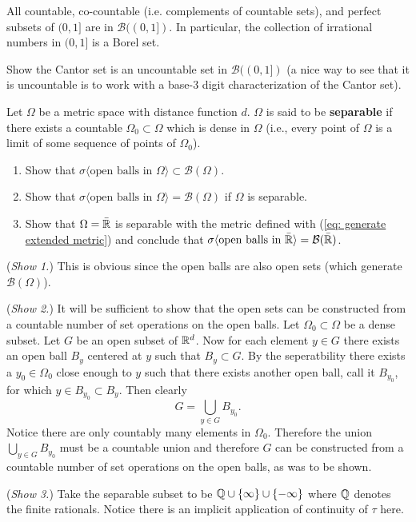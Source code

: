 \begin{example}
All countable, co-countable (i.e. complements of countable sets), and perfect subsets of $(0,1]$ are in $\mathcal B((0,1])$. In particular, the collection of  irrational numbers in $(0,1]$ is a Borel set.
\end{example}

\begin{exercise}
Show the Cantor set is an uncountable set in $\mathcal B((0,1])$ (a nice way to see that it is uncountable is to work with a base-3 digit characterization of the Cantor set).
\end{exercise}


\begin{exercise}
Let $\Omega$ be a metric space with distance function $d$. $\Omega$ is said to be {\bf separable} if there exists a countable $\Omega_0\subset \Omega$ which is dense in $\Omega$ (i.e., every point of $\Omega$ is a limit of some sequence of points of $\Omega_0$).
\begin{enumerate}
\item Show that $\sigma\langle \text{open balls in $\Omega$}\rangle\subset \mathcal B(\Omega)$.
\item Show that  $\sigma\langle \text{open balls in $\Omega$}\rangle= \mathcal B(\Omega)$ if $\Omega$ is separable.
\item Show that $\Omega = \bar {\Bbb R}$ is separable with the metric defined with (\ref{eq: generate extended metric}) and conclude that $\sigma\langle \text{open balls in $\bar{\Bbb R}$}\rangle= \mathcal B(\bar{\Bbb R})$.
\end{enumerate}
\end{exercise}

\begin{exerciseproof}
({\sl Show 1.})
This is obvious since the open balls are also open sets (which generate $\mathcal B(\Omega)$).

({\sl Show 2.})
It will be sufficient to show that the open sets can be constructed from a countable number of set operations on the open balls. Let $\Omega_0\subset \Omega$ be a dense subset.
Let $G$ be an open subset of $\Bbb R^d$. Now for each element $y\in G$ there exists an open ball $B_y$ centered at $y$ such that $B_y\subset G$. By the seperatbility there exists a $y_0\in \Omega_0$ close enough to $y$ such that there exists another open ball, call it $B_{y_0}$, for which  $y\in B_{y_0}\subset B_y$. Then clearly
\[
G = \bigcup_{y\in G} B_{y_0}.
\]
 Notice  there are only countably many elements in $\Omega_0$. Therefore the union $ \bigcup_{y\in G} B_{y_0}$ must be a countable union  and therefore $G$ can be constructed  from a countable number of set operations on the open balls, as was to be shown.


({\sl Show 3.}) Take the separable subset to be $\Bbb Q\cup \{ \infty\} \cup \{ -\infty\}$ where $\Bbb Q$ denotes the finite rationals. Notice there is an implicit application of continuity of $\tau$ here.
\end{exerciseproof}

